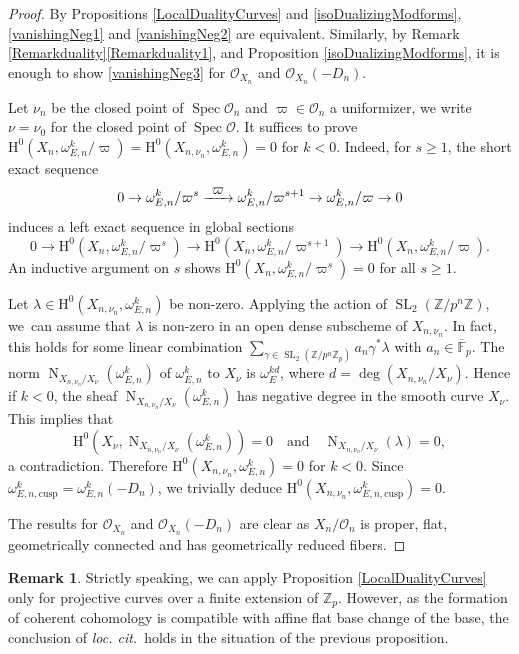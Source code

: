 \documentclass[11pt]{article}
\providecommand{\loccit}{\emph{loc. cit.}}
\newcommand{\quand}{\quad\text{and}\quad}
\newcommand\To[1]{\mathchoice{\xrightarrow{\textstyle\kern4pt#1\kern3pt}}{\stackrel{#1}{\to}}{}{}}
\newcommand{\cusp}{\mathrm{cusp}}
\numberwithin{equation}{section}
\theoremstyle{definition}
\newtheorem{remark}[prop]{Remark}
\newcommand{\bb}[1]{\mathbb{#1}}
\newcommand{\n}[1]{\mathcal{#1}}
\newcommand{\s}[1]{\mathscr{#1}}
\DeclareMathOperator{\SL}{SL}
\DeclareMathOperator{\N}{N}
\DeclareMathOperator{\Spec}{Spec}
\begin{document}
\begin{proof}
By Propositions \ref{LocalDualityCurves} and \ref{isoDualizingModforms}, \eqref{vanishingNeg1} and \eqref{vanishingNeg2} are equivalent. Similarly, by \hbox{Remark} \ref{Remarkduality}\eqref{Remarkduality1}, and Proposition \ref{isoDualizingModforms}, it is enough to show \eqref{vanishingNeg3} for $\s{O}_{X_n}$ and $\s{O}_{X_n}(-D_n)$.

Let $\nu_n$ be the closed point of $\Spec \n{O}_n$ and $\varpi\in \n{O}_n$ a uniformizer, we write $\nu=\nu_0$ for the closed point of $\Spec \n{O}$. It suffices to prove $\mathrm{H}^0(X_{n}, \omega^k_{E,n}/\varpi)=\mathrm{H}^0(X_{n,\nu_n}, \omega^k_{E,n})=0$ for $k<0$. Indeed, for $s\geq 1$, the short exact sequence
\[0\to \omega^k_{E,n}/ \varpi^{s}\To{\varpi} \omega^k_{E,n}/\varpi^{s+1}\to \omega^{k}_{E,n}/\varpi \to 0\]
induces a left exact sequence in global sections
\[
0\to \mathrm{H}^0(X_n, \omega^k_{E,n}/ \varpi^s)\to \mathrm{H}^0(X_n, \omega^k_{E,n}/\varpi^{s+1})\to \mathrm{H}^0(X_n, \omega^k_{E,n}/\varpi).
\]
An inductive argument on $s$ shows $\mathrm{H}^0(X_n, \omega^k_{E,n}/\varpi^s)=0$ for all $s\geq 1$.

Let $\lambda\in \mathrm{H}^0(X_{n,\nu_n}, \omega^k_{E,n})$ be non-zero. Applying the action of $\SL_2(\bb{Z}/p^n\bb{Z})$, we~can assume that $\lambda$ is non-zero in an open dense subscheme of $X_{n,\nu_n}$. In fact, this holds for some linear combination $\sum_{\gamma\in \SL_2(\bb{Z}/p^n\bb{Z}_p)} a_n \gamma^* \lambda$ with $a_n\in \overline{\bb{F}}_p$. The norm $\N_{X_{n,\nu_n}/X_{\nu}}(\omega^k_{E,n})$ of $\omega^k_{E,n}$ to $X_\nu$ is $\omega^{kd}_{E}$, where $d=\deg(X_{n,\nu_n}/X_\nu)$. Hence if $k<0$, the sheaf $\N_{X_{n,\nu_n}/X_\nu}(\omega^k_{E,n})$ has negative degree in the smooth curve $X_{\nu}$. This implies that
\[
\mathrm{H}^0(X_{\nu}, \N_{X_{n,\nu_n}/X_\nu}(\omega^k_{E,n}))=0\quand\N_{X_{n,\nu_n}/X_{\nu}}(\lambda)=0,
\]
a contradiction. Therefore $\mathrm{H}^0(X_{n,\nu_n}, \omega^k_{E,n})\!=\!0$ for $k\!<\!0$. Since $\omega^k_{E,n,\cusp}\!=\!\omega_{E,n}^k(-D_n)$, we trivially deduce $\mathrm{H}^0(X_{n,\nu_n},\omega^k_{E,n,\cusp})=0$.

The results for $\s{O}_{X_n}$ and $\s{O}_{X_n}(-D_n)$ are clear as $X_n/\n{O}_{n}$ is proper, flat, geometrically connected and has geometrically reduced fibers.
\end{proof}

\begin{remark}
\label{remark1}
Strictly speaking, we can apply Proposition \ref{LocalDualityCurves} only for projective curves over a finite extension of $\bb{Z}_p$. However, as the formation of coherent cohomology is compatible with affine flat base change of the base, the conclusion of \loccit\ holds in the situation of the previous proposition.
\end{remark}
\end{document}
